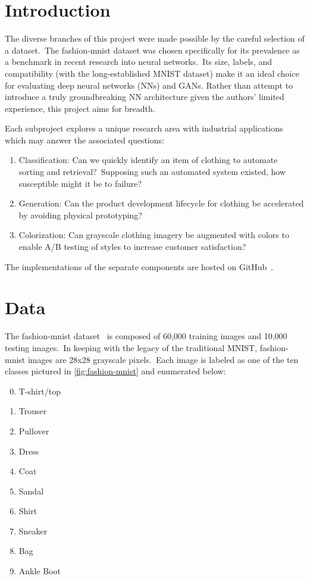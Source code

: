 \documentclass[conference]{IEEEtran}
\begin{document}
    \section{Introduction}\label{sec:introduction}

    The diverse branches of this project were made possible by the careful selection of a dataset.\ The fashion-mnist dataset was chosen specifically for its prevalence as a benchmark in recent research into neural networks.\ Its size, labels, and compatibility (with the long-established MNIST dataset) make it an ideal choice for evaluating deep neural networks (NNs) and GANs. Rather than attempt to introduce a truly groundbreaking NN architecture given the authors' limited experience, this project aims for breadth.

    Each subproject explores a unique research area with industrial applications which may answer the associated questions:

    \begin{enumerate}
        \item Classification: Can we quickly identify an item of clothing to automate sorting and retrieval?\ Supposing such an automated system existed, how susceptible might it be to failure?
        \item Generation: Can the product development lifecycle for clothing be accelerated by avoiding physical prototyping?
        \item Colorization: Can grayscale clothing imagery be augmented with colors to enable A/B testing of styles to increase customer satisfaction?
    \end{enumerate}

    The implementations of the separate components are hosted on GitHub~\cite{e-in-style,pytorch-generative-model-collections}.

    \section{Data}\label{sec:data}

    The fashion-mnist dataset~\cite{xiao2017/online} is composed of 60,000 training images and 10,000 testing images.\ In keeping with the legacy of the traditional MNIST, fashion-mnist images are 28x28 grayscale pixels.\ Each image is labeled as one of the ten classes pictured in \autoref{fig:fashion-mnist} and enumerated below:

    \begin{enumerate}
        \setcounter{enumi}{-1}
        \item T-shirt/top
        \item Trouser
        \item Pullover
        \item Dress
        \item Coat
        \item Sandal
        \item Shirt
        \item Sneaker
        \item Bag
        \item Ankle Boot
    \end{enumerate}
\end{document}
